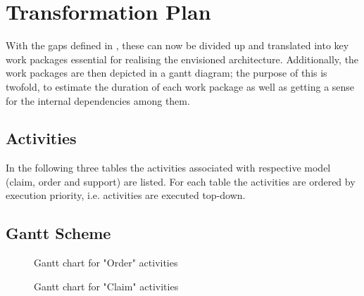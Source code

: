 \section{Transformation Plan}
\label{sec:transformation_plan}
With the gaps defined in , these can now be divided up and translated into key work packages essential for realising the envisioned architecture. Additionally, the work packages are then depicted in a gantt diagram; the purpose of this is twofold,  to estimate the duration of each work package as well as getting a sense for the internal dependencies among them.
%
\subsection{Activities}
In the following three tables the activities associated with respective model (claim, order and support) are listed. For each table the activities are ordered by execution priority, i.e. activities are executed top-down.


\subsection{Gantt Scheme}
\begin{center}
	\begin{figure}[H]
		\centering
		\setlength\fboxsep{7pt}
		\setlength\fboxrule{0.5pt}
		\caption{Gantt chart for "Order" activities}
		\label{fig:gant_order}
	\end{figure}
\end{center}
\begin{center}
	\begin{figure}[H]
		\centering
		\setlength\fboxsep{7pt}
		\setlength\fboxrule{0.5pt}
		\caption{Gantt chart for "Claim" activities}
		\label{fig:gant_claim}
	\end{figure}
\end{center}

